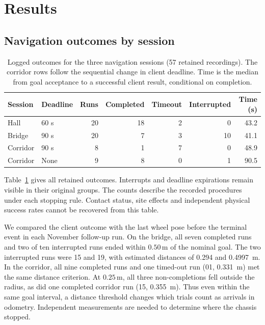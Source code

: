 \documentclass[pdflatex,sn-mathphys-num]{sn-jnl}
\newcommand{\m}{\,\mathrm{m}}
\begin{document}
\section{Results}\label{sec:results}


\subsection{Navigation outcomes by session}

\begin{table}[htbp]
\caption{Logged outcomes for the three navigation sessions (57 retained recordings). The corridor rows follow the sequential change in client deadline. Time is the median from goal acceptance to a successful client result, conditional on completion.}
\label{tab:session-outcomes}
\centering\small
\setlength{\tabcolsep}{3.5pt}
\begin{tabular}{@{}llrrrrr@{}}
\toprule
Session & Deadline & Runs & Completed & Timeout & Interrupted & Time (s) \\
\midrule
Hall & 60 s & 20 & 18 & 2 & 0 & 43.2 \\
Bridge & 90 s & 20 & 7 & 3 & 10 & 41.1 \\
Corridor & 90 s & 8 & 1 & 7 & 0 & 48.9 \\
Corridor & None & 9 & 8 & 0 & 1 & 90.5 \\
\bottomrule
\end{tabular}
\end{table}

Table~\ref{tab:session-outcomes} gives all retained outcomes. Interrupts and deadline expirations remain visible in their original groups. The counts describe the recorded procedures under each stopping rule. Contact status, site effects and independent physical success rates cannot be recovered from this table.

We compared the client outcome with the last wheel pose before the terminal event in each November follow-up run. On the bridge, all seven completed runs and two of ten interrupted runs ended within $0.50\m$ of the nominal goal. The two interrupted runs were 15 and 19, with estimated distances of 0.294 and 0.4997~m. In the corridor, all nine completed runs and one timed-out run (01, 0.331~m) met the same distance criterion. At $0.25\m$, all three non-completions fell outside the radius, as did one completed corridor run (15, 0.355~m). Thus even within the same goal interval, a distance threshold changes which trials count as arrivals in odometry. Independent measurements are needed to determine where the chassis stopped.
\end{document}
